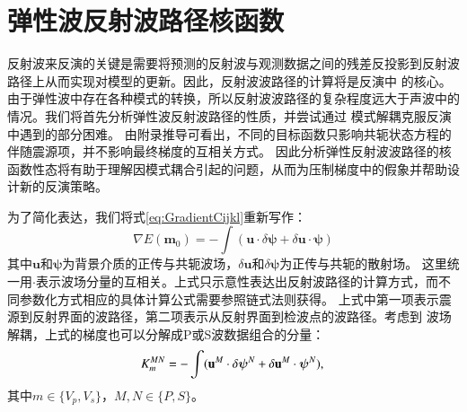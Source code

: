 \section{弹性波反射波路径核函数}
反射波来反演的关键是需要将预测的反射波与观测数据之间的残差反投影到反射波路径上从而实现对模型的更新。因此，反射波波路径的计算将是反演中
的核心。由于弹性波中存在各种模式的转换，所以反射波波路径的复杂程度远大于声波中的情况。我们将首先分析弹性波反射波路径的性质，并尝试通过
模式解耦克服反演中遇到的部分困难。
由附录\cite{cha:AdjointForEWERTI}推导可看出，不同的目标函数只影响共轭状态方程的伴随震源项，并不影响最终梯度的互相关方式。
因此分析弹性反射波波路径的核函数性态将有助于理解因模式耦合引起的问题，从而为压制梯度中的假象并帮助设计新的反演策略。

为了简化表达，我们将式\eqref{eq:GradientCijkl}重新写作：
\begin{equation}
    \nabla E(
    \mathbf{m}_0)=-\int(
    \mathbf{u}\cdot\delta \boldsymbol{\psi}
    +\delta
    \mathbf{u}\cdot{\boldsymbol{\psi}})
    \label{eq:kernelgradient} 
\end{equation} 
其中$\mathbf{u}$和$\boldsymbol{\psi}$为背景介质的正传与共轭波场，$\delta\mathbf{u}$和$\delta \boldsymbol{\psi}$为正传与共轭的散射场。
这里统一用$\cdot$表示波场分量的互相关。上式只示意性表达出反射波路径的计算方式，而不同参数化方式相应的具体计算公式需要参照链式法则获得。
上式中第一项表示震源到反射界面的波路径，第二项表示从反射界面到检波点的波路径。考虑到
波场解耦，上式的梯度也可以分解成P或S波数据组合的分量：
\begin{equation}
    K_m^{MN}     
    =-\int(\mathbf{u}^M\cdot\delta \boldsymbol{\psi}^N
    +\delta  \mathbf{u}^M\cdot\boldsymbol{\psi}^N),\\
    \label{eq:decompkernel} 
\end{equation}
其中$m\in\{V_p, V_s\}$，$M,N\in\{P,S\}$。

